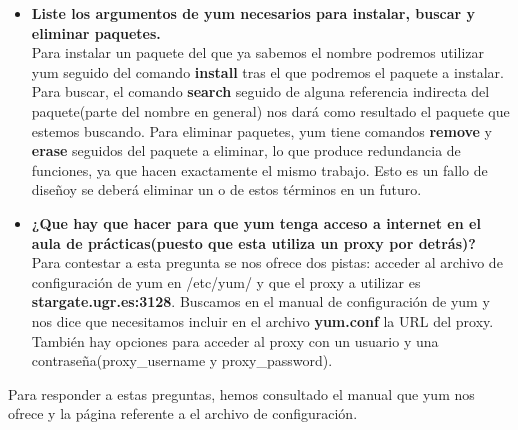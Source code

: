 \begin{itemize}
	\item \textbf{Liste los argumentos de yum necesarios para instalar, buscar y eliminar paquetes.}\\
	Para instalar un paquete del que ya sabemos el nombre podremos utilizar yum seguido del comando \textbf{install} tras el que podremos el paquete a instalar. Para buscar, el comando \textbf{search} seguido de alguna referencia indirecta del paquete(parte del nombre en general) nos dará como resultado el paquete que estemos buscando. Para eliminar paquetes, yum tiene comandos \textbf{remove} y \textbf{erase} seguidos del paquete a eliminar, lo que produce redundancia de funciones, ya que hacen exactamente el mismo trabajo. Esto es un fallo de diseñoy se deberá eliminar un o de estos términos en un futuro.\\
	
	\item \textbf{¿Que hay que hacer para que yum tenga acceso a internet en el aula de prácticas(puesto que esta utiliza un proxy por detrás)?}\\
	Para contestar a esta pregunta se nos ofrece dos pistas: acceder al archivo de configuración de yum en /etc/yum/ y que el proxy a utilizar es \textbf{stargate.ugr.es:3128}. Buscamos en el manual de configuración de yum y nos dice que necesitamos incluir en el archivo \textbf{yum.conf} la URL del proxy. También hay opciones para acceder al proxy con un usuario y una contraseña(proxy\_username y proxy\_password).
	
\end{itemize}
Para responder a estas preguntas, hemos consultado el manual que yum nos ofrece\cite{a1} y la página referente a el archivo de configuración\cite{a2}.

